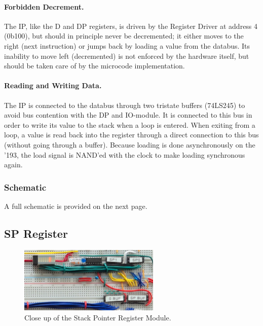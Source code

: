\paragraph{Forbidden Decrement.} The IP, like the D and DP registers, is driven by the Register Driver at address 4 (0b100), but should in principle never be decremented; it either moves to the right (next instruction) or jumps back by loading a value from the databus. Its inability to move left (decremented) is not enforced by the hardware itself, but should be taken care of by the microcode implementation.

\paragraph{Reading and Writing Data.} The IP is connected to the databus through two tristate buffers (74LS245) to avoid bus contention with the DP and IO-module. It is connected to this bus in order to write its value to the stack when a loop is entered. When exiting from a loop, a value is read back into the register through a direct connection to this bus (without going through a buffer). Because loading is done asynchronously on the '193, the load signal is NAND'ed with the clock to make loading synchronous again.

\subsubsection{Schematic}
A full schematic is provided on the next page.



\subsection{SP Register}
\begin{figure}[H]
  \centering
  \includegraphics[width=0.6\textwidth]{img/spregistercloseup}
  \caption{Close up of the Stack Pointer Register Module.}
  \label{fig:spregcloseup}
\end{figure}

